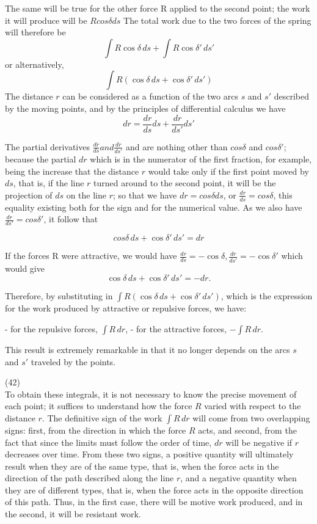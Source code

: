 \documentclass{book}
\begin{document}
The same will be true for the other force R applied to the second point; the work it will produce will be \(R cos \delta ds\)
The total work due to the two forces of the spring will therefore be
\[ \int R \cos \delta \, ds + \int R \cos \delta' \, ds' \]
or alternatively,
\[ \int R (\cos \delta \, ds + \cos \delta' \, ds') \]
The distance \(r\) can be considered as a function of the two arcs \(s\) and \(s'\) described by the moving points, and by the principles of differential calculus we have
\[dr = \frac{{dr}}{{ds}} ds + \frac{{dr}}{{ds'}} ds'\]

The partial derivatives \(\frac{{dr}}{{ds}} and \frac{{dr}}{{ds'}}\) and are nothing other than \(cos \delta\) and \(cos \delta'\); because the partial \(dr\) which is in the numerator of the first fraction, for example, being the increase that the distance \(r\) would take only if the first point moved by \(ds\), that is, if the line \(r\) turned around to the second point, it will be the projection of \(ds\) on the line \(r\); so that we have \(dr=cos\delta ds\), or \(\frac{{dr}}{{ds}} = cos \delta \), this equality existing both for the sign and for the numerical value. As we also have \(\frac{{dr}}{{ds'}} = cos \delta' \), it follow that

\[cos \delta \, ds + \cos \delta' \, ds' = dr\]


If the forces R were attractive, we would have 
\( \frac{{dr}}{{ds}} = -\cos \delta, \frac{{dr}}{{ds'}} = -\cos \delta' \)
which would give
\[ \cos \delta \, ds + \cos \delta' \, ds' = -dr. \]

Therefore, by substituting in \(\int R (\cos \delta \, ds + \cos \delta' \, ds')\), which is the expression 
for the work produced by attractive or repulsive forces, we have:

- for the repulsive forces, \(\int R \, dr\),
- for the attractive forces, \(-\int R \, dr\).


This result is extremely remarkable in that it no longer depends on the arcs 
\(s\) and \(s'\) traveled by the points.

\newpage
(42)  \\
To obtain these integrals, it is not necessary to know the precise movement of each point; it suffices to understand how the force \( R \) varied with respect to the distance \( r \). 
The definitive sign of the work \(\int R \, dr \) will come from two overlapping signs: first, from the direction in which the force \( R \) acts, and second, from the fact that since the limits must follow the order of time, \( dr \) will be negative if \( r \) decreases over time. From these two signs, a positive quantity will ultimately result when they are of the same type, that is, when the force acts in the direction of the path described along the line \( r \), and a negative quantity when they are of different types, that is, when the force acts in the opposite direction of this path. Thus, in the first case, there will be motive work produced, and in the second, it will be resistant work.
\end{document}
